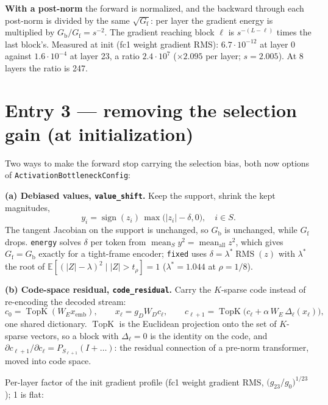 \documentclass[11pt,a4paper]{article}
\newcommand{\code}[1]{\texttt{#1}}
\newcommand{\Gf}{G_{\mathrm{f}}}
\newcommand{\Gb}{G_{\mathrm{b}}}
\newcommand{\topk}{\operatorname{TopK}}
\newcommand{\rms}{\operatorname{RMS}}
\begin{document}
\textbf{With a post-norm} the forward is normalized, and the backward through
each post-norm is divided by the same \(\sqrt{\Gf}\): per layer the gradient
energy is multiplied by \(\Gb/\Gf=s^{-2}\).  The gradient reaching block
\(\ell\) is \(s^{-(L-\ell)}\) times the last block's.  Measured at init (fc1
weight gradient RMS): \(6.7\cdot10^{-12}\) at layer 0 against
\(1.6\cdot10^{-4}\) at layer 23, a ratio \(2.4\cdot10^{7}\) (\(\times2.095\) per
layer; \(s=2.005\)).  At 8 layers the ratio is 247.

\section{Entry 3 --- removing the selection gain (at initialization)}

Two ways to make the forward stop carrying the selection bias, both now options
of \code{ActivationBottleneckConfig}:

\textbf{(a) Debiased values, \code{value\_shift}.}  Keep the support, shrink the
kept magnitudes,
\begin{equation}
  y_i=\operatorname{sign}(z_i)\,\max\bigl(|z_i|-\delta,0\bigr),\quad i\in S .
\end{equation}
The tangent Jacobian on the support is unchanged, so \(\Gb\) is unchanged, while
\(\Gf\) drops.  \code{energy} solves \(\delta\) per token from
\(\operatorname{mean}_S y^2=\operatorname{mean}_{\text{all}} z^2\), which gives
\(\Gf=\Gb\) exactly for a tight-frame encoder; \code{fixed} uses
\(\delta=\lambda^\ast\rms(z)\) with \(\lambda^\ast\) the root of
\(\mathbb E[(|Z|-\lambda)^2\mid |Z|>t_\rho]=1\) (\(\lambda^\ast=1.044\) at
\(\rho=1/8\)).

\textbf{(b) Code-space residual, \code{code\_residual}.}  Carry the \(K\)-sparse
code instead of re-encoding the decoded stream:
\begin{equation}
  c_0=\topk(W_E x_{\mathrm{emb}}),\qquad x_\ell=g_D W_D c_\ell,\qquad
  c_{\ell+1}=\topk\bigl(c_\ell+\alpha\,W_E\,\Delta_\ell(x_\ell)\bigr),
\end{equation}
one shared dictionary.  \(\topk\) is the Euclidean projection onto the set of
\(K\)-sparse vectors, so a block with \(\Delta_\ell=0\) is the identity on the
code, and \(\partial c_{\ell+1}/\partial c_\ell=P_{S_{\ell+1}}(I+\dots)\): the
residual connection of a pre-norm transformer, moved into code space.

Per-layer factor of the init gradient profile (fc1 weight gradient RMS,
\(\bigl(g_{23}/g_0\bigr)^{1/23}\)); 1 is flat:
\end{document}

